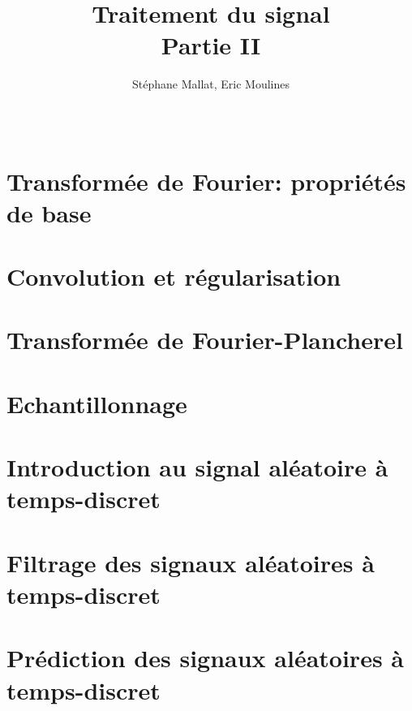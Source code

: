 \documentclass[a4paper,11pt]{book}
\title{Traitement du signal\\
Partie II}
\author{St\'ephane Mallat, Eric Moulines}
\date{\ }
\theoremstyle{break}
\begin{document}
\maketitle
\tableofcontents

\chapter{Transform{\'e}e de Fourier: propri{\'e}t{\'e}s de base}

\chapter{Convolution et régularisation}

\chapter{Transform{\'e}e de Fourier-Plancherel}

\chapter{Echantillonnage}


\chapter{Introduction au signal al\'eatoire \`a temps-discret}


\chapter{Filtrage des signaux al\'eatoires \`a temps-discret}

\chapter{Pr\'ediction des signaux al\'eatoires \`a temps-discret}

%

%



\end{document}
